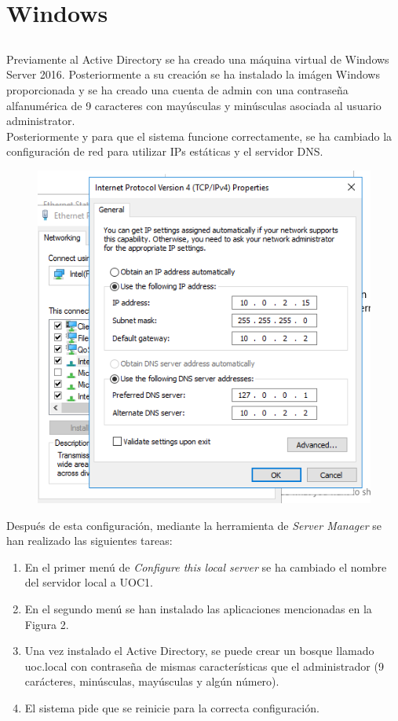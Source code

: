 \documentclass[10pt,a4paper]{article}
\begin{document}
\section{Windows}

\subsection{}
Previamente al Active Directory se ha creado una máquina virtual de Windows Server 2016. Posteriormente a su creación se ha instalado la imágen Windows proporcionada y se ha creado una cuenta de admin con una contraseña alfanumérica de 9 caracteres con mayúsculas y minúsculas asociada al usuario administrator. \\
Posteriormente y para que el sistema funcione correctamente, se ha cambiado la configuración de red para utilizar IPs estáticas y el servidor DNS.

\begin{figure}[h!]
\centering
\includegraphics[scale=0.6]{static_ip.png}
\end{figure}

Después de esta configuración, mediante la herramienta de \textit{Server Manager} se han realizado las siguientes tareas:
\begin{enumerate}
\item En el primer menú de\textit{ Configure this local server} se ha cambiado el nombre del servidor local a UOC1.
\item En el segundo menú se han instalado las aplicaciones mencionadas en la Figura 2.
\item Una vez instalado el Active Directory, se puede crear un bosque llamado uoc.local con contraseña de mismas características que el administrador (9 carácteres, minúsculas, mayúsculas y algún número).
\item El sistema pide que se reinicie para la correcta configuración.
\end{enumerate}
\end{document}
